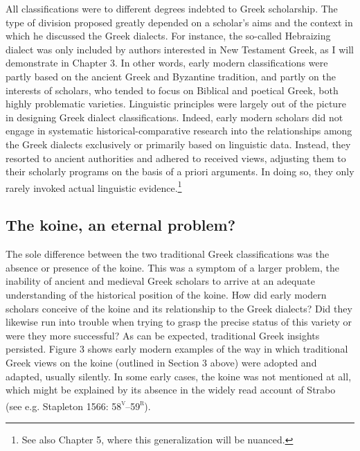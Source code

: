 \begin{styleStandard}
All classifications were to different degrees indebted to Greek scholarship. The type of division proposed greatly depended on a scholar’s aims and the context in which he discussed the Greek dialects. For instance, the so-called Hebraizing dialect was only included by authors interested in New Testament Greek, as I will demonstrate in Chapter 3. In other words, early modern classifications were partly based on the ancient Greek and Byzantine tradition, and partly on the interests of scholars, who tended to focus on Biblical and poetical Greek, both highly problematic varieties. Linguistic principles were largely out of the picture in designing Greek dialect classifications. Indeed, early modern scholars did not engage in systematic historical-comparative research into the relationships among the Greek dialects exclusively or primarily based on linguistic data. Instead, they resorted to ancient authorities and adhered to received views, adjusting them to their scholarly programs on the basis of a priori arguments. In doing so, they only rarely invoked actual linguistic evidence.\footnote{ See also Chapter 5, where this generalization will be nuanced.}
\end{styleStandard}

\subsection{The koine, an eternal problem?}
\hypertarget{Toc19704815}{}\begin{styleStandard}
The sole difference between the two traditional Greek classifications was the absence or presence of the koine. This was a symptom of a larger problem, the inability of ancient and medieval Greek scholars to arrive at an adequate understanding of the historical position of the koine. How did early modern scholars conceive of the koine and its relationship to the Greek dialects? Did they likewise run into trouble when trying to grasp the precise status of this variety or were they more successful? As can be expected, traditional Greek insights persisted. Figure 3 shows early modern examples of the way in which traditional Greek views on the koine (outlined in Section 3 above) were adopted and adapted, usually silently. In some early cases, the koine was not mentioned at all, which might be explained by its absence in the widely read account of Strabo (see e.g. Stapleton 1566: 58\textsc{\textsuperscript{v}}–59\textsc{\textsuperscript{r}}).
\end{styleStandard}

